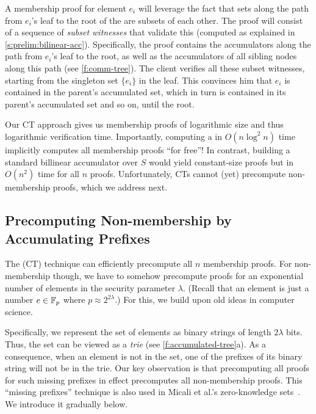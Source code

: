 A membership proof for element $e_i$ will leverage the fact that sets along the path from $e_i$'s leaf to the root of the \communionTree are subsets of each other.
The proof will consist of a sequence of \textit{subset witnesses} that validate this (computed as explained in \cref{s:prelim:bilinear-acc}).
Specifically, the proof contains the accumulators along the path from $e_i$'s leaf to the root, as well as the accumulators of all sibling nodes along this path (see \cref{f:comm-tree}).
The client verifies all these subset witnesses, starting from the singleton set $\{e_i\}$ in the leaf.
This convinces  him that $e_i$ is contained in the parent's accumulated set, which in turn is contained in its parent's accumulated set and so on, until the root.

Our CT approach gives us membership proofs of logarithmic size and thus logarithmic verification time.
Importantly, computing a \communionTree in $O(n\log^2{n})$ time implicitly computes all membership proofs ``for free''!
In contrast, building a standard billinear accumulator over $S$ would yield constant-size proofs but in $O(n^2)$ time for all $n$ proofs.
Unfortunately, CTs cannot (yet) precompute non-membership proofs, which we address next.

\accumulatedTreeFig

\subsection{Precomputing Non-membership by Accumulating Prefixes}
The \communionTree (CT) technique can efficiently precompute all $n$ membership proofs.
For non-membership though, we have to somehow precompute proofs for an exponential number of elements in the security parameter $\lambda$.
(Recall that an element is just a number $e\in \mathbb{F}_p$ where $p\approx 2^{2\lambda}$.)
For this, we build upon old ideas in computer science.

Specifically, we represent the set of elements as binary strings of length $2\lambda$ bits.
Thus, the set can be viewed as a \textit{trie} (see \cref{f:accumulated-tree}a).
As a consequence, when an element is not in the set, one of the prefixes of its binary string will not be in the trie.
Our key observation is that precomputing all proofs for such missing prefixes in effect precomputes all non-membership proofs.
This ``missing prefixes'' technique is also used in Micali et al.'s zero-knowledge sets~\cite{zks}.
We introduce it gradually below.

